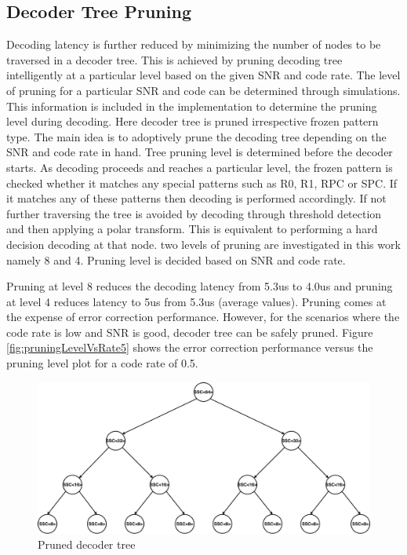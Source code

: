 \subsection{Decoder Tree Pruning}
Decoding latency is further reduced by minimizing the number of nodes to be traversed in a decoder tree. This is achieved by pruning decoding tree intelligently at a particular level based on the given SNR and code rate. The level of pruning for a particular SNR and code can be determined through simulations. This information is included in the implementation to determine the pruning level during decoding. Here decoder tree is pruned irrespective frozen pattern type. The main idea is to adoptively prune the decoding tree depending on the SNR and code rate in hand. Tree pruning level is determined before the decoder starts. As decoding proceeds and reaches a particular level, the frozen pattern is checked whether it matches any special patterns such as R0, R1, RPC or SPC. If it matches any of these patterns then decoding is performed accordingly. If not further traversing the tree is avoided by decoding through threshold detection and then applying a polar transform. This is equivalent to performing a hard decision decoding at that node. two levels of pruning are investigated in this work namely 8 and 4. Pruning level is decided based on SNR and code rate.

Pruning at level 8 reduces the decoding latency from 5.3us to 4.0us and pruning at level 4 reduces latency to 5us from 5.3us (average values). Pruning comes at the expense of error correction performance. However, for the scenarios where the code rate is low and SNR is good, decoder tree can be safely pruned. Figure \ref{fig:pruningLevelVsRate5} shows the error correction performance versus the pruning level plot for a code rate of 0.5.


\begin{figure}[]
	\centering
	\includegraphics[width=1\textwidth]{./figures/prunedDecoderTree.pdf}
	\caption{Pruned decoder tree}
	\label{fig:prunedDecoderTree}
\end{figure}

